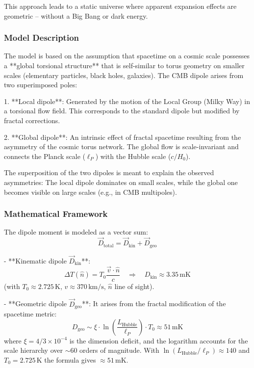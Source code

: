 This approach leads to a static universe where apparent expansion effects are geometric – without a Big Bang or dark energy.

\subsubsection{Model Description}

The model is based on the assumption that spacetime on a cosmic scale possesses a **global torsional structure** that is self-similar to torus geometry on smaller scales (elementary particles, black holes, galaxies). The CMB dipole arises from two superimposed poles:

1. **Local dipole**: Generated by the motion of the Local Group (Milky Way) in a torsional flow field. This corresponds to the standard dipole but modified by fractal corrections.

2. **Global dipole**: An intrinsic effect of fractal spacetime resulting from the asymmetry of the cosmic torus network. The global flow is scale-invariant and connects the Planck scale ($\ell_P$) with the Hubble scale ($c/H_0$).

The superposition of the two dipoles is meant to explain the observed asymmetries: The local dipole dominates on small scales, while the global one becomes visible on large scales (e.g., in CMB multipoles).

\subsubsection{Mathematical Framework}

The dipole moment is modeled as a vector sum:
\begin{equation}
	\vec{D}_{\text{total}} = \vec{D}_{\text{kin}} + \vec{D}_{\text{geo}}
	\label{eq:two_dipole}
\end{equation}

- **Kinematic dipole $\vec{D}_{\text{kin}}$**:
\[
\Delta T(\hat{n}) = T_0 \frac{\vec{v} \cdot \hat{n}}{c} \quad \Rightarrow \quad D_{\text{kin}} \approx 3.35\,\text{mK}
\]
(with $T_0 \approx 2.725\,\text{K}$, $v \approx 370\,\text{km/s}$, $\hat{n}$ line of sight).

- **Geometric dipole $\vec{D}_{\text{geo}}$**:
It arises from the fractal modification of the spacetime metric:
\[
D_{\text{geo}} \sim \xi \cdot \ln\left(\frac{L_{\text{Hubble}}}{\ell_P}\right) \cdot T_0 \approx 51\,\text{mK}
\]
where $\xi = 4/3 \times 10^{-4}$ is the dimension deficit, and the logarithm accounts for the scale hierarchy over $\sim 60$ orders of magnitude.
With $\ln(L_{\text{Hubble}}/\ell_P) \approx 140$ and $T_0 = 2.725$\,K the formula gives $\approx 51$\,mK.

